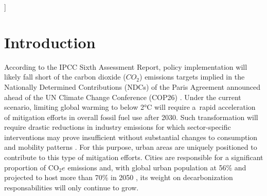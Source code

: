 \documentclass[
  10pt,
  twocolumn]{aft}
\begin{document}
\begin{@twocolumnfalse}
\begin{minipage}{\dimexpr\paperwidth-6.5cm}
\begin{abstract}
\begin{normalsize}
\end{normalsize}
\end{abstract}
\begin{flushleft}
\setlength{}
\end{flushleft}
\end{minipage}

\vspace{3em}
\end{@twocolumnfalse}]
\makeatother
\section{Introduction}\label{sec-introduction}

According to the IPCC Sixth Assessment Report, policy implementation
will likely fall short of the carbon dioxide (\(CO_2\)) emissions
targets implied in the Nationally Determined Contributions (NDCs) of the
Paris Agreement announced ahead of the UN Climate Change Conference
(COP26) \citep{ipcc_summary_2022}. Under the current scenario, limiting
global warming to below 2°C will require a~rapid acceleration of
mitigation efforts in overall fossil fuel use after 2030. Such
transformation will require drastic reductions in industry emissions for
which sector-specific interventions may prove insufficient without
substantial changes to consumption and mobility patterns
\citep{ipcc_summary_2023}. For this purpose, urban areas are uniquely
positioned to contribute to this type of mitigation efforts. Cities are
responsible for a significant proportion of \(\text{CO}_2e\) emissions
\citep{ipcc_climate_2023, wiedmann_city_2021, hoornweg_cities_2011} and,
with global urban population at 56\% and projected to host more than
70\% in 2050 \citep{un_world_2022}, its weight on decarbonization
responsabilities will only continue to grow.
\end{document}
